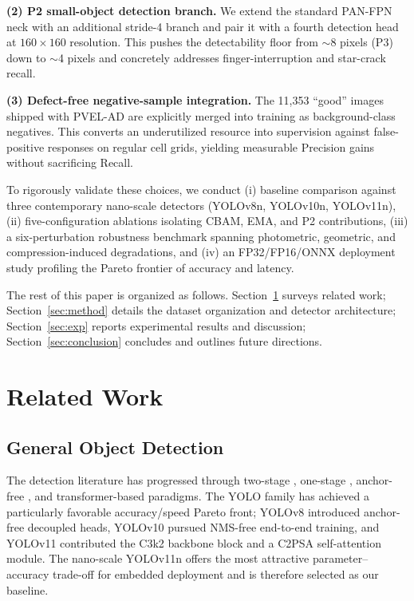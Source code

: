 \documentclass[journal,onecolumn,11pt]{IEEEtran}
\begin{document}
\textbf{(2) P2 small-object detection branch.} We extend the standard PAN-FPN neck with an additional stride-4 branch and pair it with a fourth detection head at $160\times160$ resolution. This pushes the detectability floor from $\sim$8 pixels (P3) down to $\sim$4 pixels and concretely addresses finger-interruption and star-crack recall.

\textbf{(3) Defect-free negative-sample integration.} The 11{,}353 ``good'' images shipped with PVEL-AD are explicitly merged into training as background-class negatives. This converts an underutilized resource into supervision against false-positive responses on regular cell grids, yielding measurable Precision gains without sacrificing Recall.

To rigorously validate these choices, we conduct (i) baseline comparison against three contemporary nano-scale detectors (YOLOv8n, YOLOv10n, YOLOv11n), (ii) five-configuration ablations isolating CBAM, EMA, and P2 contributions, (iii) a six-perturbation robustness benchmark spanning photometric, geometric, and compression-induced degradations, and (iv) an FP32/FP16/ONNX deployment study profiling the Pareto frontier of accuracy and latency.

The rest of this paper is organized as follows. Section~\ref{sec:related} surveys related work; Section~\ref{sec:method} details the dataset organization and detector architecture; Section~\ref{sec:exp} reports experimental results and discussion; Section~\ref{sec:conclusion} concludes and outlines future directions.

\section{Related Work}
\label{sec:related}

\subsection{General Object Detection}
The detection literature has progressed through two-stage \cite{ren2017fasterrcnn}, one-stage \cite{redmon2016yolo,liu2016ssd}, anchor-free \cite{tian2019fcos}, and transformer-based \cite{carion2020detr,zhao2024rtdetr} paradigms. The YOLO family has achieved a particularly favorable accuracy/speed Pareto front; YOLOv8 \cite{jocher2023yolov8} introduced anchor-free decoupled heads, YOLOv10 \cite{wang2024yolov10} pursued NMS-free end-to-end training, and YOLOv11 \cite{jocher2024yolo11} contributed the C3k2 backbone block and a C2PSA self-attention module. The nano-scale YOLOv11n offers the most attractive parameter--accuracy trade-off for embedded deployment and is therefore selected as our baseline.
\end{document}
